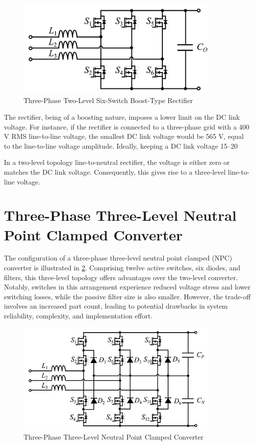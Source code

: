 \documentclass[12pt,a4paper]{book}
\begin{document}
\begin{figure}[h]
  \centering
  \includegraphics[width=10cm]{image5.png}
  \caption{Three-Phase Two-Level Six-Switch Boost-Type Rectifier}
  \label{fig:image5}
\end{figure}

The rectifier, being of a boosting nature, imposes a lower limit on the DC link voltage. For instance, if the rectifier is connected to a three-phase grid with a 400 V RMS line-to-line voltage, the smallest DC link voltage would be 565 V, equal to the line-to-line voltage amplitude. Ideally, keeping a DC link voltage 15–20%

In a two-level topology line-to-neutral rectifier, the voltage is either zero or matches the DC link voltage. Consequently, this gives rise to a three-level line-to-line voltage.

\section{Three-Phase Three-Level Neutral Point Clamped Converter }
The configuration of a three-phase three-level neutral point clamped (NPC) converter is illustrated in \ref{fig:image6}. Comprising twelve active switches, six diodes, and filters, this three-level topology offers advantages over the two-level converter. Notably, switches in this arrangement experience reduced voltage stress and lower switching losses, while the passive filter size is also smaller. However, the trade-off involves an increased part count, leading to potential drawbacks in system reliability, complexity, and implementation effort.

\begin{figure}[h]
  \centering
  \includegraphics[width=10cm]{image6.png}
  \caption{Three-Phase Three-Level Neutral Point Clamped Converter}
  \label{fig:image6}
\end{figure}
\end{document}

